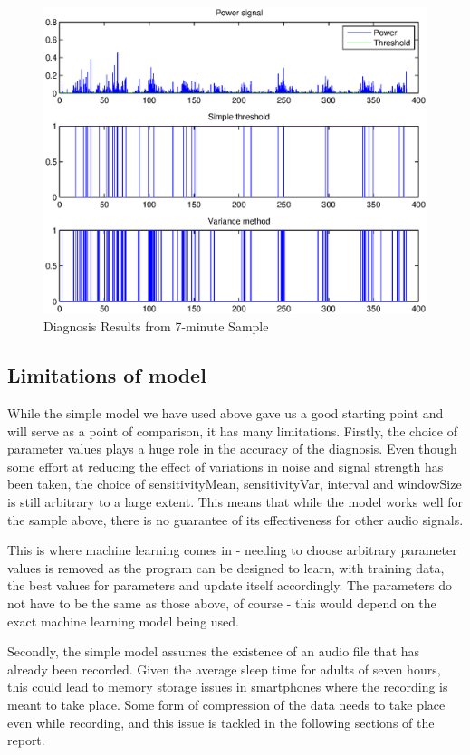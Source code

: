 \begin{figure}[htb]
\centering
\includegraphics[width=1\textwidth]{drawings/simpleResults}
\caption{Diagnosis Results from 7-minute Sample}
\label{fig:simpleResults}
\end{figure}

\subsection{Limitations of model}

While the simple model we have used above gave us a good starting point and will serve as a point of comparison, it has many limitations. Firstly, the choice of parameter values plays a huge role in the accuracy of the diagnosis. Even though some effort at reducing the effect of variations in noise and signal strength has been taken, the choice of sensitivityMean, sensitivityVar, interval and windowSize is still arbitrary to a large extent. This means that while the model works well for the sample above, there is no guarantee of its effectiveness for other audio signals.

This is where machine learning comes in - needing to choose arbitrary parameter values is removed as the program can be designed to learn, with training data, the best values for parameters and update itself accordingly. The parameters do not have to be the same as those above, of course - this would depend on the exact machine learning model being used.

Secondly, the simple model assumes the existence of an audio file that has already been recorded. Given the average sleep time for adults of seven hours, this could lead to memory storage issues in smartphones where the recording is meant to take place. Some form of compression of the data needs to take place even while recording, and this issue is tackled in the following sections of the report.